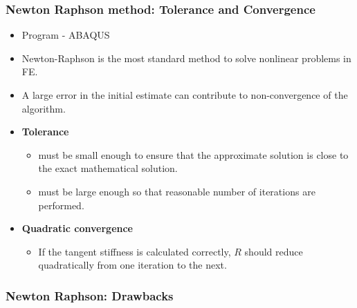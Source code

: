 \documentclass[notes]{beamer}
\begin{document}
\begin{frame}
\frametitle{Newton Raphson method: Tolerance and Convergence}
\begin{itemize}
	\item Program - ABAQUS
	\item Newton-Raphson is the most standard method to solve nonlinear problems in FE.
	\item A large error in the initial estimate can contribute to non-convergence of the algorithm.
	\item \textbf{Tolerance}
	\begin{itemize}
		\item must be small enough to ensure that the approximate
		solution is close to the exact mathematical solution.
		\item must be large enough so that reasonable number of
		iterations are performed.
	\end{itemize}
	\item \textbf{Quadratic convergence}
	\begin{itemize}
		\item If the tangent stiffness is calculated correctly, $R$ should
		reduce quadratically from one iteration to the next.
	\end{itemize}
\end{itemize}
\end{frame}

\begin{frame}
\frametitle{Newton Raphson: Drawbacks}
\end{frame}
\end{document}

